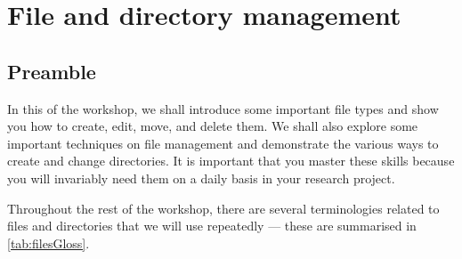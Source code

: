\section{File and directory management}
\label{sec:filedir}
  \subsection{Preamble}

    In this  of the workshop, we shall introduce some important file types and show you how to create, edit, move, and delete them.
    We shall also explore some important techniques on file management and demonstrate the various ways to create and change directories.
    It is important that you master these skills because you will invariably need them on a daily basis in your research project.

    Throughout the rest of the workshop, there are several terminologies related to files and directories that we will use repeatedly --- these are summarised in \cref{tab:filesGloss}.

